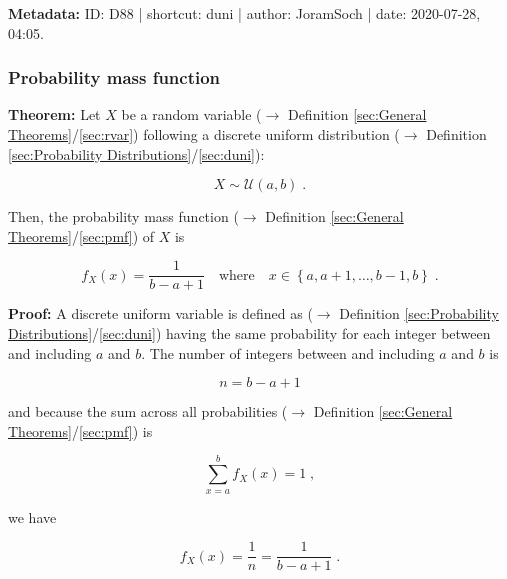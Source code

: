\documentclass[a4paper,12pt,twoside]{book}
\begin{document}
\vspace{1em}
\textbf{Metadata:} ID: D88 | shortcut: duni | author: JoramSoch | date: 2020-07-28, 04:05.
\vspace{1em}



\subsubsection[\textbf{Probability mass function}]{Probability mass function} \label{sec:duni-pmf}
\setcounter{equation}{0}

\textbf{Theorem:} Let $X$ be a random variable ($\rightarrow$ Definition \ref{sec:General Theorems}/\ref{sec:rvar}) following a discrete uniform distribution ($\rightarrow$ Definition \ref{sec:Probability Distributions}/\ref{sec:duni}):

\begin{equation} \label{eq:duni-pmf-duni}
X \sim \mathcal{U}(a, b) \; .
\end{equation}

Then, the probability mass function ($\rightarrow$ Definition \ref{sec:General Theorems}/\ref{sec:pmf}) of $X$ is

\begin{equation} \label{eq:duni-pmf-duni-pmf}
f_X(x) = \frac{1}{b-a+1} \quad \text{where} \quad x \in \left\lbrace a, a+1, \ldots, b-1, b \right\rbrace \; .
\end{equation}


\vspace{1em}
\textbf{Proof:} A discrete uniform variable is defined as ($\rightarrow$ Definition \ref{sec:Probability Distributions}/\ref{sec:duni}) having the same probability for each integer between and including $a$ and $b$. The number of integers between and including $a$ and $b$ is

\begin{equation} \label{eq:duni-pmf-n}
n = b - a + 1
\end{equation}

and because the sum across all probabilities ($\rightarrow$ Definition \ref{sec:General Theorems}/\ref{sec:pmf}) is

\begin{equation} \label{eq:duni-pmf-1}
\sum_{x=a}^{b} f_X(x) = 1 \; ,
\end{equation}

we have

\begin{equation} \label{eq:duni-pmf-duni-pmf-qed}
f_X(x) = \frac{1}{n} = \frac{1}{b-a+1} \; .
\end{equation}
\end{document}
